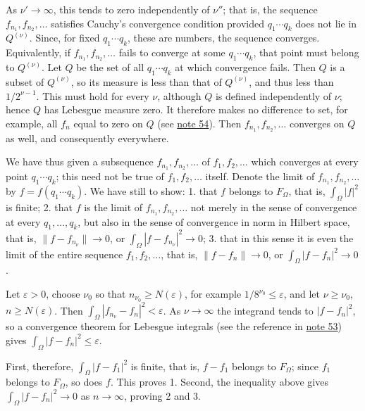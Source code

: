 \documentclass[fontsize=13pt,twoside,openany,headings=normal,parskip=false,bookmarkpackage=false,DIV=calc]{scrbook}
\begin{document}
As $\nu'\to\infty$, this tends to zero independently of $\nu''$; that is, the sequence $f_{n_1},f_{n_2},\ldots$ satisfies Cauchy's convergence condition provided $q_1\cdots q_k$ does not lie in $Q^{(\nu)}$. Since, for fixed $q_1\cdots q_k$, these are numbers, the sequence converges. Equivalently, if $f_{n_1},f_{n_2},\ldots$ fails to converge at some $q_1\cdots q_k$, that point must belong to $Q^{(\nu)}$. Let $Q$ be the set of all $q_1\cdots q_k$ at which convergence fails. Then $Q$ is a subset of $Q^{(\nu)}$, so its measure is less than that of $Q^{(\nu)}$, and thus less than $1/2^{\nu-1}$. This must hold for every $\nu$, although $Q$ is defined independently of $\nu$; hence $Q$ has Lebesgue measure zero. It therefore makes no difference to set, for example, all $f_n$ equal to zero on $Q$ (see \hyperlink{note-54}{note 54}). Then $f_{n_1},f_{n_2},\ldots$ converges on $Q$ as well, and consequently everywhere.

We have thus given a subsequence $f_{n_1},f_{n_2},\ldots$ of $f_1,f_2,\ldots$ which converges at every point $q_1\cdots q_k$; this need not be true of $f_1,f_2,\ldots$ itself. Denote the limit of $f_{n_1},f_{n_2},\ldots$ by $f=f(q_1\cdots q_k)$. We have still to show: 1. that $f$ belongs to $F_\Omega$, that is, $\int_\Omega|f|^2$ is finite; 2. that $f$ is the limit of $f_{n_1},f_{n_2},\ldots$ not merely in the sense of convergence at every $q_1,\ldots,q_k$, but also in the sense of convergence in norm in Hilbert space, that is, $\|f-f_{n_\nu}\|\to0$, or $\int_\Omega|f-f_{n_\nu}|^2\to0$; 3. that in this sense it is even the limit of the entire sequence $f_1,f_2,\ldots$, that is, $\|f-f_n\|\to0$, or $\int_\Omega|f-f_n|^2\to0$.

Let $\varepsilon>0$, choose $\nu_0$ so that $n_{\nu_0}\geq N(\varepsilon)$, for example $1/8^{\nu_0}\leq\varepsilon$, and let $\nu\geq\nu_0$, $n\geq N(\varepsilon)$. Then $\int_\Omega|f_{n_\nu}-f_n|^2<\varepsilon$. As $\nu\to\infty$ the integrand tends to $|f-f_n|^2$, so a convergence theorem for Lebesgue integrals (see the reference in \hyperlink{note-53}{note 53}) gives $\int_\Omega|f-f_n|^2\leq\varepsilon$.

\hypertarget{origpage-34}{}%
First, therefore, $\int_\Omega|f-f_1|^2$ is finite, that is, $f-f_1$ belongs to $F_\Omega$; since $f_1$ belongs to $F_\Omega$, so does $f$. This proves 1. Second, the inequality above gives $\int_\Omega|f-f_n|^2\to0$ as $n\to\infty$, proving 2 and 3.
\end{document}
